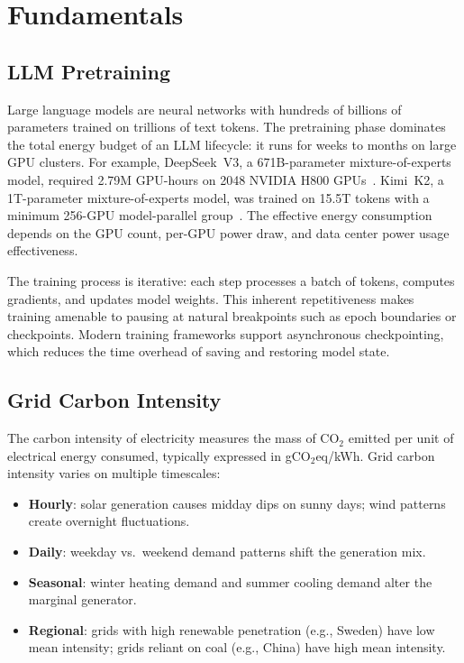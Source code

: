 
\chapter{Fundamentals}
\label{sec:fundamentals}

\section{LLM Pretraining}
\label{sec:llm-pretraining}

Large language models are neural networks with hundreds of billions of
parameters trained on trillions of text tokens.  The pretraining phase
dominates the total energy budget of an LLM lifecycle: it runs for weeks to
months on large GPU clusters.  For example, DeepSeek~V3, a 671B-parameter
mixture-of-experts model, required 2.79M GPU-hours on 2048 NVIDIA H800
GPUs~\cite{deepseek-ai_deepseek-v3_2024}.  Kimi~K2, a 1T-parameter mixture-of-experts model,
was trained on 15.5T tokens with a minimum 256-GPU model-parallel
group~\cite{kimi_team_kimi_2025}.  The effective energy consumption depends on
the GPU count, per-GPU power draw, and data center power usage effectiveness.

The training process is iterative: each step processes a batch of tokens,
computes gradients, and updates model weights.  This inherent repetitiveness
makes training amenable to pausing at natural breakpoints such as epoch
boundaries or checkpoints.  Modern training frameworks support asynchronous
checkpointing, which reduces the time overhead of saving and restoring model
state.

\section{Grid Carbon Intensity}
\label{sec:grid-carbon-intensity}

The carbon intensity of electricity measures the mass of CO$_2$ emitted per
unit of electrical energy consumed, typically expressed in
gCO$_2$eq/kWh.  Grid carbon intensity varies on multiple timescales:
\begin{itemize}
  \item \textbf{Hourly}: solar generation causes midday dips on sunny days;
    wind patterns create overnight fluctuations.
  \item \textbf{Daily}: weekday vs.\ weekend demand patterns shift the generation
    mix.
  \item \textbf{Seasonal}: winter heating demand and summer cooling demand
    alter the marginal generator.
  \item \textbf{Regional}: grids with high renewable penetration (e.g., Sweden)
    have low mean intensity; grids reliant on coal (e.g., China) have high
    mean intensity.
\end{itemize}

